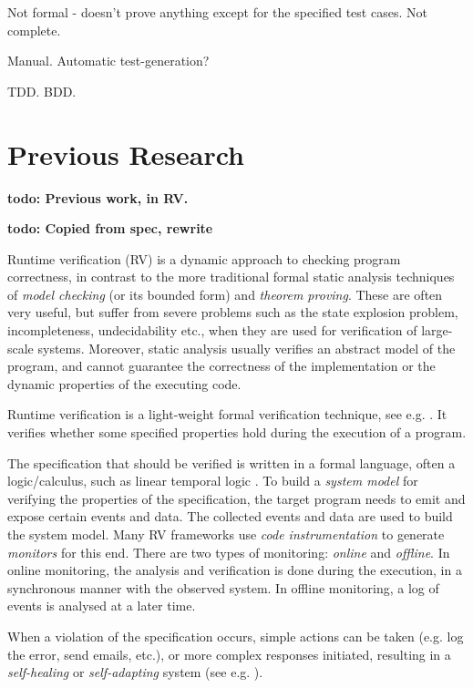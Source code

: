 \documentclass[a4paper,11pt]{kth-mag}
\newcommand{\todo}[1]{\textbf{todo: #1}}
\begin{document}
Not formal - doesn't prove anything except for the specified test cases. Not complete.

Manual. Automatic test-generation?

TDD. BDD.





\pagestyle{newchap}
\chapter{Previous Research}

\todo{Previous work, in RV.}

\todo{Copied from spec, rewrite}

Runtime verification (RV) is a dynamic approach to checking program correctness, in contrast to the more 
traditional formal static analysis techniques of \emph{model checking} (or its
bounded form) and \emph{theorem proving}. These are often very useful, but suffer from severe problems such as the
state explosion problem, incompleteness, undecidability etc.,
when they are used for verification of large-scale systems.
Moreover, static analysis usually verifies an abstract model of the program, and cannot guarantee the correctness of the implementation or the dynamic properties of the executing code.

Runtime verification is a light-weight formal verification technique, see e.g. \cite{leucker09abriefaccount,delgado04taxonomy}.
It verifies whether some specified properties hold during the execution of a
program.

The specification that should be verified is written in a formal
language, often a logic/calculus, such as linear temporal logic
\cite{pnueli77}. To build
a \emph{system model} for verifying the properties of the specification, the target program
needs to emit and expose certain events and data. The collected events and data are used to build the system model. Many RV frameworks use \textit{code instrumentation}
to generate \textit{monitors} for this end. There are two types of monitoring:
\emph{online} and \emph{offline}.
In online monitoring, the analysis and verification is done during the execution, in a synchronous
manner with the observed system. In offline monitoring, a log of events is analysed at a later time.

When a violation of the specification occurs, simple actions can be taken (e.g. log the error, send emails, etc.), or more complex responses initiated, resulting in a \textit{self-healing} or \textit{self-adapting} system (see e.g. \cite{huebscher08}).
\end{document}
